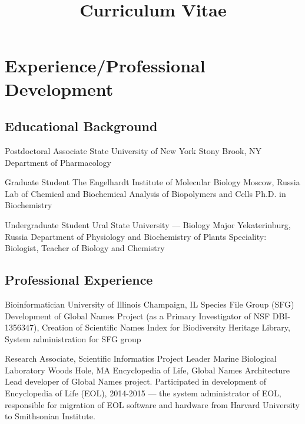 \documentclass[11pt,letterpaper,sans]{moderncv} %
\title{Curriculum Vitae}
\begin{document}
\makecvtitle %


\section{Experience/Professional Development}

\subsection{Educational Background}

{Postdoctoral Associate}
{State University of New York}
{Stony Brook, NY}
{Department of Pharmacology}
{}

{Graduate Student}
{The Engelhardt Institute of Molecular Biology}
{Moscow, Russia}
{Lab of Chemical and Biochemical Analysis of Biopolymers and Cells}
{Ph.D. in Biochemistry}

 {Undergraduate Student}
 {Ural State University --- Biology Major}
 {Yekaterinburg, Russia}
 {Department of Physiology and Biochemistry of Plants}
 {Speciality: Biologist, Teacher of Biology and Chemistry}



\subsection{Professional Experience}

{Bioinformatician}
{University of Illinois}
{Champaign, IL}
{Species File Group (SFG)}
{Development of Global Names Project (as a Primary Investigator of NSF DBI-1356347), Creation of Scientific Names Index for Biodiversity Heritage Library, System administration for SFG group}

{Research Associate, Scientific Informatics Project Leader}
{Marine Biological Laboratory}
{Woods Hole, MA}
{Encyclopedia of Life, Global Names Architecture}
{Lead developer of Global Names project. Participated in development of Encyclopedia of Life (EOL), 2014-2015 --- the system administrator of EOL, responsible for migration of EOL software and hardware from Harvard University to Smithsonian Institute.}
\end{document}
